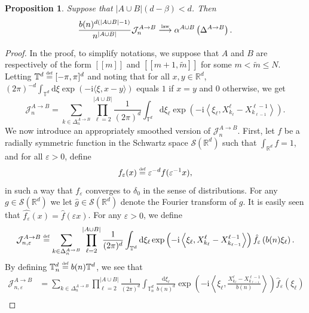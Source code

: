 \documentclass[10pt,a4paper]{amsart}
\newcommand{\RR}{\mathbb R}
\newcommand{\J}{\mathcal J}
\newcommand{\TT}{\mathbb T}
\newcommand{\1}{\mathds{1}}
\renewcommand{\d}{\mathrm d}
\renewcommand{\i}{\mathrm i}
\newcommand{\distribution}{\stackrel{\scaleto{\mathrm{law}}{4pt}}{\longrightarrow}}
\newcommand{\eqdef}{\stackrel{\scaleto{\mathrm{def}}{3.5pt}}{=}}
\newtheorem{proposition}{Proposition}
\numberwithin{equation}{section}
\begin{document}
\begin{proposition}
\label{theorem:discrete ILT convergence in distribution to continuous ILT}
    Suppose that $|A\cup B|(d-\beta)<d$. Then
    \begin{equation*}
        \frac{b(n)^{d(|A\cup B|-1)}}{n^{|A\cup B|}}\mathcal J_n^{A\rightarrow B}\distribution \alpha^{A\cup B}\left(\Delta^{A\rightarrow B}\right).
    \end{equation*}
\end{proposition}

\begin{proof}
    In the proof, to simplify notations, we suppose that $A$ and $B$ are respectively of the form $[\![m]\!]$ and $[\![m+1,\widetilde m]\!]$ for some $m<\widetilde m\le N$. Letting $\TT^d\eqdef[-\pi,\pi]^d$ and noting that for all $x,y\in\RR^d$, $(2\pi)^{-d}\int_{\TT^d}\d\xi\exp(-\i\langle\xi,x-y\rangle)$ equals $1$ if $x=y$ and $0$ otherwise, we get
    \begin{equation*}
        \mathcal J_n^{A\rightarrow B}=\sum_{k\in\Delta_n^{A\rightarrow B}}\prod_{\ell=2}^{|A\cup B|}\frac{1}{(2\pi)^d}\int_{\TT^d}\d\xi_\ell\exp\left(-\i\left\langle\xi_\ell,X_{k_\ell}^{\ell}-X_{k_{\ell-1}}^{{\ell-1}}\right\rangle\right).
    \end{equation*}
    We now introduce an appropriately smoothed version of $\J_n^{A\rightarrow B}$. First, let $f$ be a radially symmetric function in the Schwartz space $\mathcal S(\RR^d)$ such that $\int_{\RR^d} f=1$, and for all $\varepsilon>0$, define 
    \begin{equation*}
        f_\varepsilon(x)\eqdef\varepsilon^{-d}f(\varepsilon^{-1}x),
    \end{equation*}
    in such a way that $f_\varepsilon$ converges to $\delta_0$ in the sense of distributions. For any $g\in\mathcal S(\RR^d)$ we let $\hat g\in\mathcal S(\RR^d)$ denote the Fourier transform of $g$. It is easily seen that $\hat{f_\varepsilon}(x)=\hat f(\varepsilon x)$. For any $\varepsilon>0$, we define
    \begin{equation*}
        \mathcal J_{n,\varepsilon}^{A\rightarrow B}\eqdef\sum_{k\in\Delta_n^{A\rightarrow B}}\prod_{\ell=2}^{|A\cup B|}\frac{1}{(2\pi)^d}\int_{\TT^d}\d\xi_\ell\exp\left(-\i\left\langle\xi_\ell,X_{k_\ell}^{\ell}-X_{k_{\ell-1}}^{{\ell-1}}\right\rangle\right)\hat f_\varepsilon \left(b(n)\xi_\ell\right).
    \end{equation*}
    By defining $\TT_n^d\eqdef b(n)\TT^d$, we see that
    \begin{align*}
        \mathcal J_{n,\varepsilon}^{A\rightarrow B}&=\sum_{k\in\Delta_n^{A\rightarrow B}}\prod_{\ell=2}^{|A\cup B|}\frac{1}{(2\pi)^d}\int_{\TT_n^d}\frac{\d\xi_\ell}{b(n)^d}\exp\left(-\i\left\langle\xi_\ell,\frac{X_{k_\ell}^{\ell}-X_{k_{\ell-1}}^{{\ell-1}}}{b(n)}\right\rangle\right)\hat f_\varepsilon(\xi_\ell)\\

\end{align*}
\end{proof}
\end{document}
